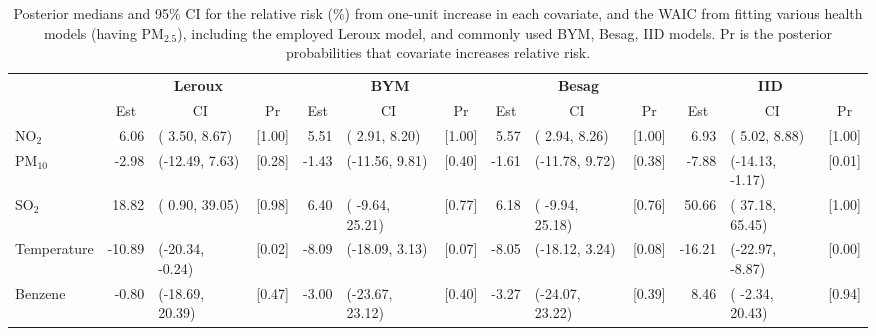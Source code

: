 \documentclass[12,]{article}
\begin{document}
\begin{landscape}\begin{table}

\caption{\label{tab:monitoringModelpm10}Posterior medians and 95\% CI for the relative risk (\%) from one-unit increase in each covariate, and the WAIC from fitting various health models (having PM$_{2.5}$), including the employed Leroux model, and commonly used BYM, Besag, IID models. Pr is the posterior probabilities that covariate increases relative risk.}
\centering
\fontsize{9}{11}\selectfont
\begin{tabular}[t]{lrlcrlcrlcrlc}
\toprule
\multicolumn{1}{c}{\textbf{ }} & \multicolumn{3}{c}{\textbf{Leroux}} & \multicolumn{3}{c}{\textbf{BYM}} & \multicolumn{3}{c}{\textbf{Besag}} & \multicolumn{3}{c}{\textbf{IID}} \\
\cmidrule(l{3pt}r{3pt}){2-4} \cmidrule(l{3pt}r{3pt}){5-7} \cmidrule(l{3pt}r{3pt}){8-10} \cmidrule(l{3pt}r{3pt}){11-13}
\multicolumn{1}{c}{ } & \multicolumn{1}{c}{Est} & \multicolumn{1}{c}{CI} & \multicolumn{1}{c}{Pr} & \multicolumn{1}{c}{Est} & \multicolumn{1}{c}{CI} & \multicolumn{1}{c}{Pr} & \multicolumn{1}{c}{Est} & \multicolumn{1}{c}{CI} & \multicolumn{1}{c}{Pr} & \multicolumn{1}{c}{Est} & \multicolumn{1}{c}{CI} & \multicolumn{1}{c}{Pr} \\
\cmidrule(l{3pt}r{3pt}){2-2} \cmidrule(l{3pt}r{3pt}){3-3} \cmidrule(l{3pt}r{3pt}){4-4} \cmidrule(l{3pt}r{3pt}){5-5} \cmidrule(l{3pt}r{3pt}){6-6} \cmidrule(l{3pt}r{3pt}){7-7} \cmidrule(l{3pt}r{3pt}){8-8} \cmidrule(l{3pt}r{3pt}){9-9} \cmidrule(l{3pt}r{3pt}){10-10} \cmidrule(l{3pt}r{3pt}){11-11} \cmidrule(l{3pt}r{3pt}){12-12} \cmidrule(l{3pt}r{3pt}){13-13}
NO$_2$ & 6.06 & (  3.50,   8.67) & [1.00] & 5.51 & (  2.91,   8.20) & [1.00] & 5.57 & (  2.94,   8.26) & [1.00] & 6.93 & (  5.02,   8.88) & [1.00]\\
PM$_{10}$ & -2.98 & (-12.49,   7.63) & [0.28] & -1.43 & (-11.56,   9.81) & [0.40] & -1.61 & (-11.78,   9.72) & [0.38] & -7.88 & (-14.13,  -1.17) & [0.01]\\
SO$_2$ & 18.82 & (  0.90,  39.05) & [0.98] & 6.40 & ( -9.64,  25.21) & [0.77] & 6.18 & ( -9.94,  25.18) & [0.76] & 50.66 & ( 37.18,  65.45) & [1.00]\\
Temperature & -10.89 & (-20.34,  -0.24) & [0.02] & -8.09 & (-18.09,   3.13) & [0.07] & -8.05 & (-18.12,   3.24) & [0.08] & -16.21 & (-22.97,  -8.87) & [0.00]\\
Benzene & -0.80 & (-18.69,  20.39) & [0.47] & -3.00 & (-23.67,  23.12) & [0.40] & -3.27 & (-24.07,  23.22) & [0.39] & 8.46 & ( -2.34,  20.43) & [0.94]\\

\end{tabular}
\end{table}
\end{landscape}
\end{document}
